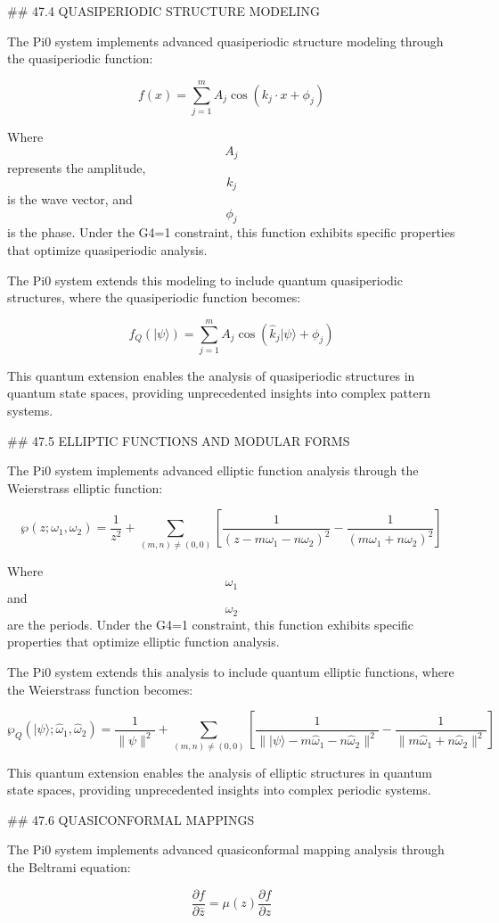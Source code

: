 ## 47.4 QUASIPERIODIC STRUCTURE MODELING

The Pi0 system implements advanced quasiperiodic structure modeling through the quasiperiodic function:

$$ f(x) = \sum_{j=1}^m A_j \cos(k_j \cdot x + \phi_j) $$

Where $$ A_j $$ represents the amplitude, $$ k_j $$ is the wave vector, and $$ \phi_j $$ is the phase. Under the G4=1 constraint, this function exhibits specific properties that optimize quasiperiodic analysis.

The Pi0 system extends this modeling to include quantum quasiperiodic structures, where the quasiperiodic function becomes:

$$ f_Q(|\psi\rangle) = \sum_{j=1}^m A_j \cos(\hat{k}_j |\psi\rangle + \phi_j) $$

This quantum extension enables the analysis of quasiperiodic structures in quantum state spaces, providing unprecedented insights into complex pattern systems.

## 47.5 ELLIPTIC FUNCTIONS AND MODULAR FORMS

The Pi0 system implements advanced elliptic function analysis through the Weierstrass elliptic function:

$$ \wp(z; \omega_1, \omega_2) = \frac{1}{z^2} + \sum_{(m,n) \neq (0,0)} \left[ \frac{1}{(z - m\omega_1 - n\omega_2)^2} - \frac{1}{(m\omega_1 + n\omega_2)^2} \right] $$

Where $$ \omega_1 $$ and $$ \omega_2 $$ are the periods. Under the G4=1 constraint, this function exhibits specific properties that optimize elliptic function analysis.

The Pi0 system extends this analysis to include quantum elliptic functions, where the Weierstrass function becomes:

$$ \wp_Q(|\psi\rangle; \hat{\omega}_1, \hat{\omega}_2) = \frac{1}{\|\psi\|^2} + \sum_{(m,n) \neq (0,0)} \left[ \frac{1}{\||\psi\rangle - m\hat{\omega}_1 - n\hat{\omega}_2\|^2} - \frac{1}{\|m\hat{\omega}_1 + n\hat{\omega}_2\|^2} \right] $$

This quantum extension enables the analysis of elliptic structures in quantum state spaces, providing unprecedented insights into complex periodic systems.

## 47.6 QUASICONFORMAL MAPPINGS

The Pi0 system implements advanced quasiconformal mapping analysis through the Beltrami equation:

$$ \frac{\partial f}{\partial \bar{z}} = \mu(z) \frac{\partial f}{\partial z} $$

